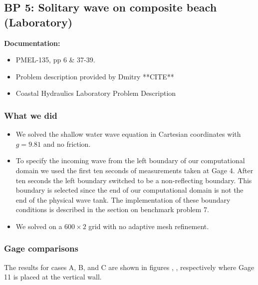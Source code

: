 \newsection

\subsection{BP 5:
 Solitary wave on composite beach (Laboratory) }

{\bf Documentation:}  
\begin{itemize}
\item PMEL-135, pp 6 \& 37-39.
\item Problem description provided by Dmitry **CITE**
\item Coastal Hydraulics Laboratory Problem Description\cite{CHLBP2}
\end{itemize}

\subsubsection{What we did}
\begin{itemize}
\item We solved the shallow water wave equation in Cartesian coordinates with $g = 9.81$ and no friction.
\item To specify the incoming wave from the left boundary of our computational domain we used the first ten seconds of  measurements taken at Gage 4.  After ten seconds the left boundary switched to be a non-reflecting boundary.  This boundary is selected since the end of our computational domain is not the end of the physical wave tank.  The implementation of these boundary conditions is described in the section on benchmark problem 7. 
\item We solved on a $600 \times 2$ grid with no adaptive mesh refinement. 
\end{itemize}

\subsubsection{Gage comparisons}
The results for cases A, B, and C are shown in figures , ,  respectively where Gage 11 is placed at the vertical wall.

